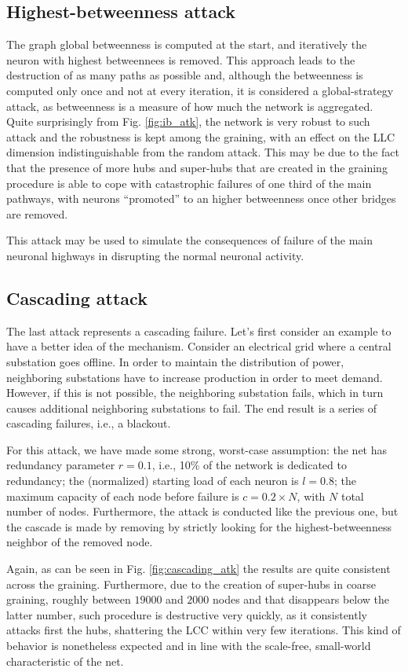 \subsection{Highest-betweenness attack}
The graph global betweenness is computed at the start, and iteratively the neuron with highest betweennees is removed. This approach leads to the destruction of as many paths as possible and, although the betweenness is computed only once and not at every iteration, it is considered a global-strategy attack, as betweenness is a measure of how much the network is aggregated. Quite surprisingly from Fig. \ref{fig:ib_atk}, the network is very robust to such attack and the robustness is kept among the graining, with an effect on the LLC dimension indistinguishable from the random attack. This may be due to the fact that the presence of more hubs and super-hubs that are created in the graining procedure is able to cope with catastrophic failures of one third of the main pathways, with neurons ``promoted'' to an higher betweenness once other bridges are removed.

This attack may be used to simulate the consequences of failure of the main neuronal highways in disrupting the normal neuronal activity.
	
\subsection{Cascading attack}
The last attack represents a cascading failure. Let's first consider an example to have a better idea of the mechanism. Consider an electrical grid where a central substation goes offline. In order to maintain the distribution of power, neighboring substations have to increase production in order to meet demand. However, if this is not possible, the neighboring substation fails, which in turn causes additional neighboring substations to fail. The end result is a series of cascading failures, i.e., a blackout.

For this attack, we have made some strong, worst-case assumption: the net has redundancy parameter $r = 0.1$, i.e., 10\% of the network is dedicated to redundancy; the (normalized) starting load of each neuron is $l=0.8$; the maximum capacity of each node before failure is $c = 0.2 \times N$, with $N$ total number of nodes. Furthermore, the attack is conducted like the previous one, but the cascade is made by removing by strictly looking for the highest-betweenness neighbor of the removed node.

Again, as can be seen in Fig. \ref{fig:cascading_atk} the results are quite consistent across the graining. Furthermore, due to the creation of super-hubs in coarse graining, roughly between $19000$ and $2000$ nodes and that disappears below the latter number, such procedure is destructive very quickly, as it consistently attacks first the hubs, shattering the LCC within very few iterations. This kind of behavior is nonetheless expected and in line with the scale-free, small-world characteristic of the net.

